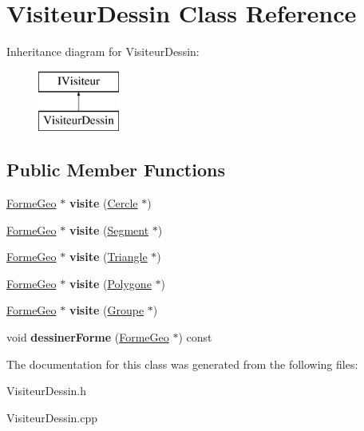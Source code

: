 \hypertarget{class_visiteur_dessin}{}\section{Visiteur\+Dessin Class Reference}
\label{class_visiteur_dessin}
Inheritance diagram for Visiteur\+Dessin\+:\begin{figure}[H]
\begin{center}
\leavevmode
\includegraphics[height=2.000000cm]{d6/d4f/class_visiteur_dessin}
\end{center}
\end{figure}
\subsection*{Public Member Functions}
\begin{DoxyCompactItemize}
\item 
\mbox{\label{class_visiteur_dessin_af0a5be93413c5668762db44352106fa6}} 
\mbox{\hyperlink{class_forme_geo}{Forme\+Geo}} $\ast$ {\bfseries visite} (\mbox{\hyperlink{class_cercle}{Cercle}} $\ast$)
\item 
\mbox{\label{class_visiteur_dessin_abf0516ee263fb5073886ea60add47aa9}} 
\mbox{\hyperlink{class_forme_geo}{Forme\+Geo}} $\ast$ {\bfseries visite} (\mbox{\hyperlink{class_segment}{Segment}} $\ast$)
\item 
\mbox{\label{class_visiteur_dessin_a6606f7a44b49b373ee5f76ca015be8af}} 
\mbox{\hyperlink{class_forme_geo}{Forme\+Geo}} $\ast$ {\bfseries visite} (\mbox{\hyperlink{class_triangle}{Triangle}} $\ast$)
\item 
\mbox{\label{class_visiteur_dessin_adb1b8c009fc3b2fb4c420b2272921ca5}} 
\mbox{\hyperlink{class_forme_geo}{Forme\+Geo}} $\ast$ {\bfseries visite} (\mbox{\hyperlink{class_polygone}{Polygone}} $\ast$)
\item 
\mbox{\label{class_visiteur_dessin_aa0a61b55bc9da026781b9b82f5e9d6bd}} 
\mbox{\hyperlink{class_forme_geo}{Forme\+Geo}} $\ast$ {\bfseries visite} (\mbox{\hyperlink{class_groupe}{Groupe}} $\ast$)
\item 
\mbox{\label{class_visiteur_dessin_a2ff0c79061a717f4e4f02ad6b3dea4f7}} 
void {\bfseries dessiner\+Forme} (\mbox{\hyperlink{class_forme_geo}{Forme\+Geo}} $\ast$) const
\end{DoxyCompactItemize}


The documentation for this class was generated from the following files\+:\begin{DoxyCompactItemize}
\item 
Visiteur\+Dessin.\+h\item 
Visiteur\+Dessin.\+cpp\end{DoxyCompactItemize}

